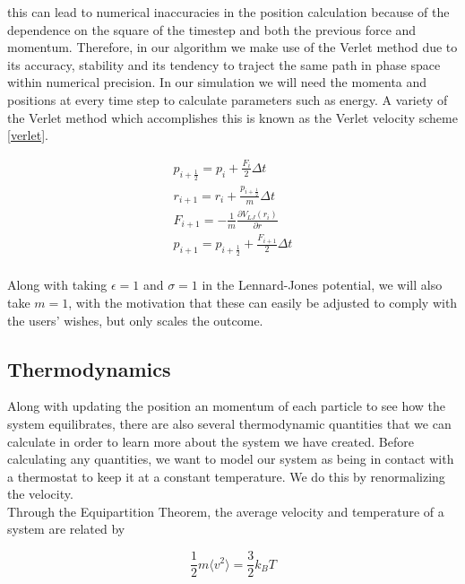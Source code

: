 \documentclass{article}
\begin{document}
\begin{multicols}{2}
\noindent this can lead to numerical inaccuracies in the position calculation because of the dependence on the square of the timestep and both the previous force and momentum. Therefore, in our algorithm we make use of the Verlet method due to its accuracy, stability and its tendency to traject the same path in phase space within numerical precision. In our simulation we will need the momenta and positions at every time step to calculate parameters such as energy. A variety of the Verlet method which accomplishes this is known as the Verlet velocity scheme \ref{verlet}.


\begin{equation}
\label{verletvscheme}
\begin{split}
p_{i+\frac{1}{2}}=p_i + \frac{F_i}{2} \Delta t \\
r_{i+1}=r_i+\frac{p_{i+\frac{1}{2}}}{m} \Delta t \\
F_{i+1}=-\frac{1}{m} \frac{\partial V_{LJ}(r_i)}{\partial r} \\
p_{i+1} = p_{i+\frac{1}{2}} + \frac{F_{i+1}}{2} \Delta t \\
\end{split}
\end{equation}

Along with taking $\epsilon =1$ and $\sigma =1$ in the Lennard-Jones potential, we will also take $m=1$, with the motivation that these can easily be adjusted to comply with the users' wishes, but only scales the outcome.

\subsection{Thermodynamics}
\label{thermo}

Along with updating the position an momentum of each particle to see how the system equilibrates, there are also several thermodynamic quantities that we can calculate in order to learn more about the system we have created.  Before calculating any quantities, we want to model our system as being in contact with a thermostat to keep it at a constant temperature.  We do this by renormalizing the velocity.  \\

Through the Equipartition Theorem, the average velocity and temperature of a system are related by

\begin{equation}
\label{vir}
\frac{1}{2}m \langle v^2 \rangle = \frac{3}{2} k_B T
\end{equation}


\end{multicols}
\end{document}
